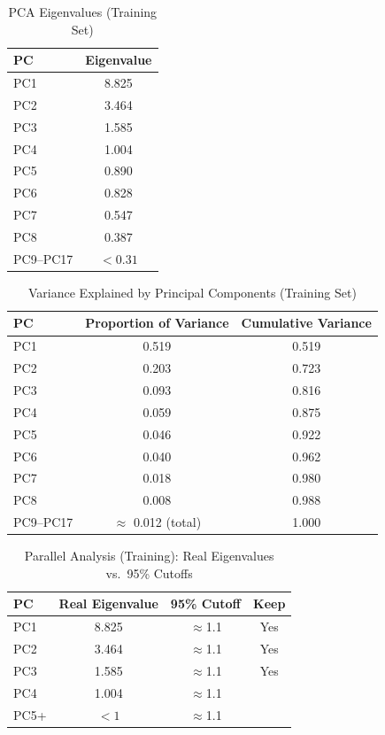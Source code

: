 \documentclass[
]{article}
\begin{document}
\begin{table}[!htbp]\centering
\caption{PCA Eigenvalues (Training Set)}
\label{tab:A2}
\begin{tabular}{lc}
\toprule
PC & Eigenvalue \\
\midrule
PC1 & 8.825 \\
PC2 & 3.464 \\
PC3 & 1.585 \\
PC4 & 1.004 \\
PC5 & 0.890 \\
PC6 & 0.828 \\
PC7 & 0.547 \\
PC8 & 0.387 \\
PC9--PC17 & $<0.31$ \\
\bottomrule
\end{tabular}
\end{table}

\begin{table}[!htbp]\centering
\caption{Variance Explained by Principal Components (Training Set)}
\label{tab:A3}
\begin{tabular}{lcc}
\toprule
PC & Proportion of Variance & Cumulative Variance \\
\midrule
PC1 & 0.519 & 0.519 \\
PC2 & 0.203 & 0.723 \\
PC3 & 0.093 & 0.816 \\
PC4 & 0.059 & 0.875 \\
PC5 & 0.046 & 0.922 \\
PC6 & 0.040 & 0.962 \\
PC7 & 0.018 & 0.980 \\
PC8 & 0.008 & 0.988 \\
PC9--PC17 & $\approx$ 0.012 (total) & 1.000 \\
\bottomrule
\end{tabular}
\end{table}

\begin{table}[!htbp]\centering
\caption{Parallel Analysis (Training): Real Eigenvalues vs.\ 95\% Cutoffs}
\label{tab:A4}
\begin{tabular}{lccc}
\toprule
PC & Real Eigenvalue & 95\% Cutoff & Keep \\
\midrule
PC1 & 8.825 & $\approx$1.1 & Yes \\
PC2 & 3.464 & $\approx$1.1 & Yes \\
PC3 & 1.585 & $\approx$1.1 & Yes \\
PC4 & 1.004 & $\approx$1.1 &  \\
PC5+ & $<1$ & $\approx$1.1 &  \\
\bottomrule
\end{tabular}
\end{table}
\end{document}
